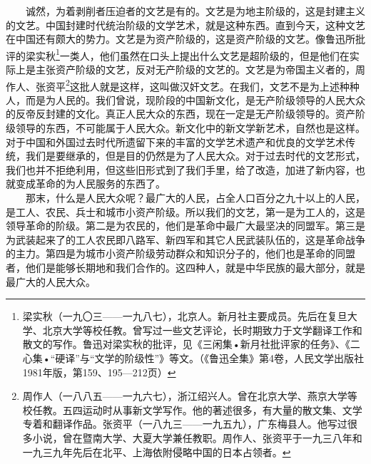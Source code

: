 \documentclass[cn,11pt,chinese]{elegantbook}
\begin{document}
　　诚然，为着剥削者压迫者的文艺是有的。文艺是为地主阶级的，这是封建主义的文艺。中国封建时代统治阶级的文学艺术，就是这种东西。直到今天，这种文艺在中国还有颇大的势力。文艺是为资产阶级的，这是资产阶级的文艺。像鲁迅所批评的梁实秋\footnote[3]{ 梁实秋（一九〇三——一九八七），北京人。新月社主要成员。先后在复旦大学、北京大学等校任教。曾写过一些文艺评论，长时期致力于文学翻译工作和散文的写作。鲁迅对梁实秋的批评，见《三闲集•新月社批评家的任务》、《二心集•“硬译”与“文学的阶级性”》等文。（《鲁迅全集》第4卷，人民文学出版社1981年版，第159、195—212页）}一类人，他们虽然在口头上提出什么文艺是超阶级的，但是他们在实际上是主张资产阶级的文艺，反对无产阶级的文艺的。文艺是为帝国主义者的，周作人、张资平\footnote[4]{ 周作人（一八八五——一九六七），浙江绍兴人。曾在北京大学、燕京大学等校任教。五四运动时从事新文学写作。他的著述很多，有大量的散文集、文学专着和翻译作品。张资平（一八九三——一九五九），广东梅县人。他写过很多小说，曾在暨南大学、大夏大学兼任教职。周作人、张资平于一九三八年和一九三九年先后在北平、上海依附侵略中国的日本占领者。}这批人就是这样，这叫做汉奸文艺。在我们，文艺不是为上述种种人，而是为人民的。我们曾说，现阶段的中国新文化，是无产阶级领导的人民大众的反帝反封建的文化。真正人民大众的东西，现在一定是无产阶级领导的。资产阶级领导的东西，不可能属于人民大众。新文化中的新文学新艺术，自然也是这样。对于中国和外国过去时代所遗留下来的丰富的文学艺术遗产和优良的文学艺术传统，我们是要继承的，但是目的仍然是为了人民大众。对于过去时代的文艺形式，我们也并不拒绝利用，但这些旧形式到了我们手里，给了改造，加进了新内容，也就变成革命的为人民服务的东西了。\\
　　那末，什么是人民大众呢？最广大的人民，占全人口百分之九十以上的人民，是工人、农民、兵士和城市小资产阶级。所以我们的文艺，第一是为工人的，这是领导革命的阶级。第二是为农民的，他们是革命中最广大最坚决的同盟军。第三是为武装起来了的工人农民即八路军、新四军和其它人民武装队伍的，这是革命战争的主力。第四是为城市小资产阶级劳动群众和知识分子的，他们也是革命的同盟者，他们是能够长期地和我们合作的。这四种人，就是中华民族的最大部分，就是最广大的人民大众。\\
\end{document}
